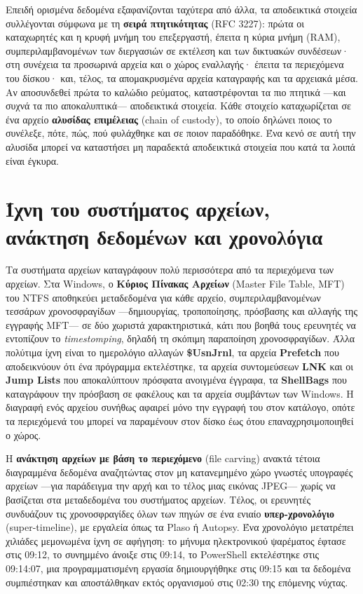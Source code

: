 \documentclass[11pt,openany]{book}
\begin{document}
Επειδή ορισμένα δεδομένα εξαφανίζονται ταχύτερα από άλλα, τα αποδεικτικά στοιχεία συλλέγονται σύμφωνα με τη \textbf{σειρά πτητικότητας} (RFC 3227): πρώτα οι καταχωρητές και η κρυφή μνήμη του επεξεργαστή, έπειτα η κύρια μνήμη (RAM), συμπεριλαμβανομένων των διεργασιών σε εκτέλεση και των δικτυακών συνδέσεων· στη συνέχεια τα προσωρινά αρχεία και ο χώρος εναλλαγής· έπειτα τα περιεχόμενα του δίσκου· και, τέλος, τα απομακρυσμένα αρχεία καταγραφής και τα αρχειακά μέσα. Αν αποσυνδεθεί πρώτα το καλώδιο ρεύματος, καταστρέφονται τα πιο πτητικά —και συχνά τα πιο αποκαλυπτικά— αποδεικτικά στοιχεία. Κάθε στοιχείο καταχωρίζεται σε ένα αρχείο \textbf{αλυσίδας επιμέλειας} (chain of custody), το οποίο δηλώνει ποιος το συνέλεξε, πότε, πώς, πού φυλάχθηκε και σε ποιον παραδόθηκε. Ένα κενό σε αυτή την αλυσίδα μπορεί να καταστήσει μη παραδεκτά αποδεικτικά στοιχεία που κατά τα λοιπά είναι έγκυρα.

\section{Ίχνη του συστήματος αρχείων, ανάκτηση δεδομένων και χρονολόγια}\label{sec:12.6}
Τα συστήματα αρχείων καταγράφουν πολύ περισσότερα από τα περιεχόμενα των αρχείων. Στα Windows, ο \textbf{Κύριος Πίνακας Αρχείων} (Master File Table, MFT) του NTFS αποθηκεύει μεταδεδομένα για κάθε αρχείο, συμπεριλαμβανομένων τεσσάρων χρονοσφραγίδων —δημιουργίας, τροποποίησης, πρόσβασης και αλλαγής της εγγραφής MFT— σε δύο χωριστά χαρακτηριστικά, κάτι που βοηθά τους ερευνητές να εντοπίζουν το \emph{timestomping}, δηλαδή τη σκόπιμη παραποίηση χρονοσφραγίδων. Άλλα πολύτιμα ίχνη είναι το ημερολόγιο αλλαγών \textbf{\$UsnJrnl}, τα αρχεία \textbf{Prefetch} που αποδεικνύουν ότι ένα πρόγραμμα εκτελέστηκε, τα αρχεία συντομεύσεων \textbf{LNK} και οι \textbf{Jump Lists} που αποκαλύπτουν πρόσφατα ανοιγμένα έγγραφα, τα \textbf{ShellBags} που καταγράφουν την πρόσβαση σε φακέλους και τα αρχεία συμβάντων των Windows. Η διαγραφή ενός αρχείου συνήθως αφαιρεί μόνο την εγγραφή του στον κατάλογο, οπότε τα περιεχόμενά του μπορεί να παραμένουν στον δίσκο έως ότου επαναχρησιμοποιηθεί ο χώρος.

Η \textbf{ανάκτηση αρχείων με βάση το περιεχόμενο} (file carving) ανακτά τέτοια διαγραμμένα δεδομένα αναζητώντας στον μη κατανεμημένο χώρο γνωστές υπογραφές αρχείων —για παράδειγμα την αρχή και το τέλος μιας εικόνας JPEG— χωρίς να βασίζεται στα μεταδεδομένα του συστήματος αρχείων. Τέλος, οι ερευνητές συνδυάζουν τις χρονοσφραγίδες όλων των πηγών σε ένα ενιαίο \textbf{υπερ-χρονολόγιο} (super-timeline), με εργαλεία όπως τα Plaso ή Autopsy. Ένα χρονολόγιο μετατρέπει χιλιάδες μεμονωμένα ίχνη σε αφήγηση: το μήνυμα ηλεκτρονικού ψαρέματος έφτασε στις 09:12, το συνημμένο άνοιξε στις 09:14, το PowerShell εκτελέστηκε στις 09:14:07, μια προγραμματισμένη εργασία δημιουργήθηκε στις 09:15 και τα δεδομένα συμπιέστηκαν και αποστάλθηκαν εκτός οργανισμού στις 02:30 της επόμενης νύχτας.
\end{document}
